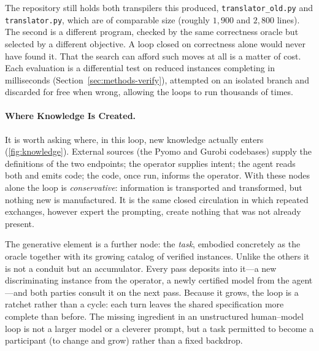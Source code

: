 \documentclass[runningheads]{llncs}
\begin{document}
The repository still holds both transpilers this produced, \texttt{translator\_old.py} and \texttt{translator.py}, which are of comparable size (roughly $1{,}900$ and $2{,}800$ lines). The second is a different program, checked by the same correctness oracle but selected by a different objective. A loop closed on correctness alone would never have found it. That the search can afford such moves at all is a matter of cost. Each evaluation is a differential test on reduced instances completing in milliseconds (Section~\ref{sec:methods-verify}), attempted on an isolated branch and discarded for free when wrong, allowing the loops to run thousands of times.

\paragraph{Where Knowledge Is Created.} It is worth asking where, in this loop, new knowledge actually enters (\autoref{fig:knowledge}). External sources (the Pyomo and Gurobi codebases) supply the definitions of the two endpoints; the operator supplies intent; the agent reads both and emits code; the code, once run, informs the operator. With these nodes alone the loop is \emph{conservative}: information is transported and transformed, but nothing new is manufactured. It is the same closed circulation in which repeated exchanges, however expert the prompting, create nothing that was not already present. 

The generative element is a further node: the \emph{task}, embodied concretely as the oracle together with its growing catalog of verified instances. Unlike the others it is not a conduit but an accumulator. Every pass deposits into it---a new discriminating instance from the operator, a newly certified model from the agent---and both parties consult it on the next pass. Because it grows, the loop is a ratchet rather than a cycle: each turn leaves the shared specification more complete than before. The missing ingredient in an unstructured human--model loop is not a larger model or a cleverer prompt, but a task permitted to become a participant (to change and grow) rather than a fixed backdrop.
\end{document}
